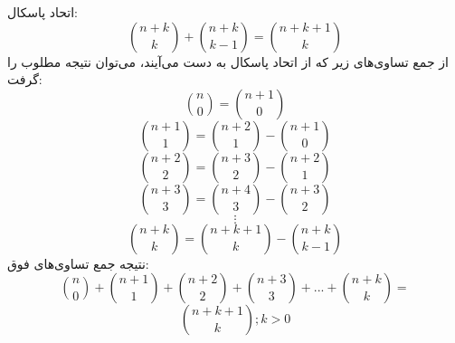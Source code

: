      اتحاد پاسکال:
     \[\binom{n+k}{k}+\binom{n+k}{k-1} = \binom{n+k+1}{k}\]
    از جمع تساوی‌های زیر که از اتحاد پاسکال به دست می‌آیند، می‌توان نتیجه مطلوب را گرفت:
    \[\binom{n}{0} = \binom{n+1}{0}\]
    \[\binom{n+1}{1} = \binom{n+2}{1}-\binom{n+1}{0}\]
    \[\binom{n+2}{2} = \binom{n+3}{2}-\binom{n+2}{1}\]
    \[\binom{n+3}{3} = \binom{n+4}{3}-\binom{n+3}{2}\]
    $$\vdots$$
    \[\binom{n+k}{k} = \binom{n+k+1}{k}-\binom{n+k}{k-1}\]
    نتیجه جمع تساوی‌های فوق:
    $$\binom{n}{0}+\binom{n+1}{1}+\binom{n+2}{2}+\binom{n+3}{3}+...+\binom{n+k}{k} =$$
     $$\binom{n+k+1}{k}; k>0$$
    